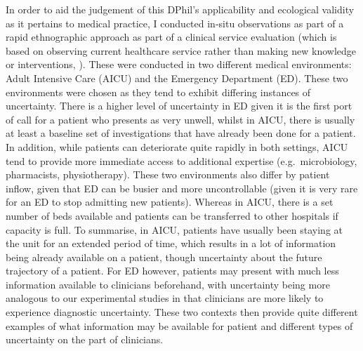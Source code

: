 \documentclass[a4paper, nobind]{templates/ociamthesis}
\begin{document}
\hfill\break
In order to aid the judgement of this DPhil's applicability and ecological validity as it pertains to medical practice, I conducted in-situ observations as part of a rapid ethnographic approach \autocite{vindrola-padros_quick_2018} as part of a clinical service evaluation (which is based on observing current healthcare service rather than making new knowledge or interventions, \textcite{twycross_service_2014}). These were conducted in two different medical environments: Adult Intensive Care (AICU) and the Emergency Department (ED). These two environments were chosen as they tend to exhibit differing instances of uncertainty. There is a higher level of uncertainty in ED given it is the first port of call for a patient who presents as very unwell, whilst in AICU, there is usually at least a baseline set of investigations that have already been done for a patient. In addition, while patients can deteriorate quite rapidly in both settings, AICU tend to provide more immediate access to additional expertise (e.g.~microbiology, pharmacists, physiotherapy). These two environments also differ by patient inflow, given that ED can be busier and more uncontrollable (given it is very rare for an ED to stop admitting new patients). Whereas in AICU, there is a set number of beds available and patients can be transferred to other hospitals if capacity is full. To summarise, in AICU, patients have usually been staying at the unit for an extended period of time, which results in a lot of information being already available on a patient, though uncertainty about the future trajectory of a patient. For ED however, patients may present with much less information available to clinicians beforehand, with uncertainty being more analogous to our experimental studies in that clinicians are more likely to experience diagnostic uncertainty. These two contexts then provide quite different examples of what information may be available for patient and different types of uncertainty on the part of clinicians.
\end{document}
